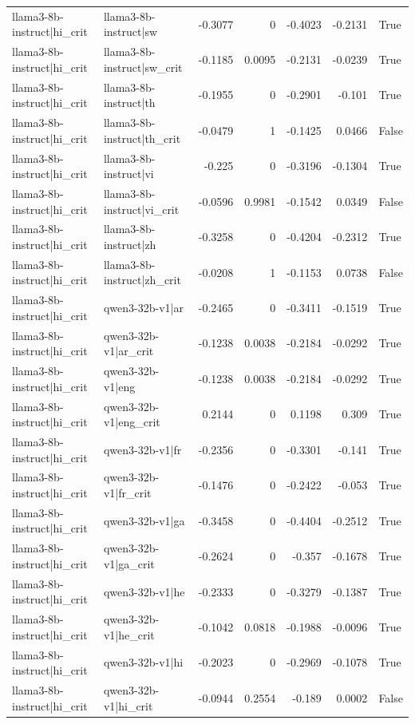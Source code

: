 \begin{table}
\begin{tabular}{l l r r r r l}
llama3-8b-instruct|hi_crit & llama3-8b-instruct|sw & -0.3077 & 0 & -0.4023 & -0.2131 & True \\
llama3-8b-instruct|hi_crit & llama3-8b-instruct|sw_crit & -0.1185 & 0.0095 & -0.2131 & -0.0239 & True \\
llama3-8b-instruct|hi_crit & llama3-8b-instruct|th & -0.1955 & 0 & -0.2901 & -0.101 & True \\
llama3-8b-instruct|hi_crit & llama3-8b-instruct|th_crit & -0.0479 & 1 & -0.1425 & 0.0466 & False \\
llama3-8b-instruct|hi_crit & llama3-8b-instruct|vi & -0.225 & 0 & -0.3196 & -0.1304 & True \\
llama3-8b-instruct|hi_crit & llama3-8b-instruct|vi_crit & -0.0596 & 0.9981 & -0.1542 & 0.0349 & False \\
llama3-8b-instruct|hi_crit & llama3-8b-instruct|zh & -0.3258 & 0 & -0.4204 & -0.2312 & True \\
llama3-8b-instruct|hi_crit & llama3-8b-instruct|zh_crit & -0.0208 & 1 & -0.1153 & 0.0738 & False \\
llama3-8b-instruct|hi_crit & qwen3-32b-v1|ar & -0.2465 & 0 & -0.3411 & -0.1519 & True \\
llama3-8b-instruct|hi_crit & qwen3-32b-v1|ar_crit & -0.1238 & 0.0038 & -0.2184 & -0.0292 & True \\
llama3-8b-instruct|hi_crit & qwen3-32b-v1|eng & -0.1238 & 0.0038 & -0.2184 & -0.0292 & True \\
llama3-8b-instruct|hi_crit & qwen3-32b-v1|eng_crit & 0.2144 & 0 & 0.1198 & 0.309 & True \\
llama3-8b-instruct|hi_crit & qwen3-32b-v1|fr & -0.2356 & 0 & -0.3301 & -0.141 & True \\
llama3-8b-instruct|hi_crit & qwen3-32b-v1|fr_crit & -0.1476 & 0 & -0.2422 & -0.053 & True \\
llama3-8b-instruct|hi_crit & qwen3-32b-v1|ga & -0.3458 & 0 & -0.4404 & -0.2512 & True \\
llama3-8b-instruct|hi_crit & qwen3-32b-v1|ga_crit & -0.2624 & 0 & -0.357 & -0.1678 & True \\
llama3-8b-instruct|hi_crit & qwen3-32b-v1|he & -0.2333 & 0 & -0.3279 & -0.1387 & True \\
llama3-8b-instruct|hi_crit & qwen3-32b-v1|he_crit & -0.1042 & 0.0818 & -0.1988 & -0.0096 & True \\
llama3-8b-instruct|hi_crit & qwen3-32b-v1|hi & -0.2023 & 0 & -0.2969 & -0.1078 & True \\
llama3-8b-instruct|hi_crit & qwen3-32b-v1|hi_crit & -0.0944 & 0.2554 & -0.189 & 0.0002 & False \\

\end{tabular}
\end{table}
